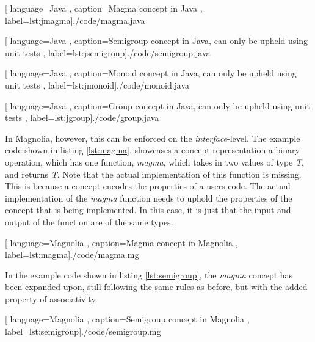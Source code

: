 \begin{center}
  
    [ language=Java
    , caption={Magma concept in Java}
    , label=lst:jmagma]{./code/magma.java}
\end{center}

\begin{center}
  
    [ language=Java
    , caption={Semigroup concept in Java, can only be upheld using unit tests}
    , label=lst:jsemigroup]{./code/semigroup.java}
\end{center}

\begin{center}
  
    [ language=Java
    , caption={Monoid concept in Java, can only be upheld using unit tests}
    , label=lst:jmonoid]{./code/monoid.java}
\end{center}

\begin{center}
  
    [ language=Java
    , caption={Group concept in Java, can only be upheld using unit tests}
    , label=lst:jgroup]{./code/group.java}
\end{center}

In Magnolia, however, this can be enforced on the \textit{interface}-level. The
example code shown in listing \ref{lst:magma}, showcases a concept
representation a binary operation, which has one function, \textit{magma}, which
takes in two values of type \textit{T}, and returns \textit{T}. Note that the
actual implementation of this function is missing. This is because a concept
encodes the properties of a users code. The actual implementation of the
\textit{magma} function needs to uphold the properties of the concept that is
being implemented. In this case, it is just that the input and output
of the function are of the same types.

\begin{center}
  
    [ language=Magnolia
    , caption={Magma concept in Magnolia}
    , label=lst:magma]{./code/magma.mg}
\end{center}

In the example code shown in listing \ref{lst:semigroup}, the \textit{magma}
concept has been expanded upon, still following the same rules as before, but
with the added property of associativity.

\begin{center}
  
    [ language=Magnolia
    , caption={Semigroup concept in Magnolia}
    , label=lst:semigroup]{./code/semigroup.mg}
\end{center}

